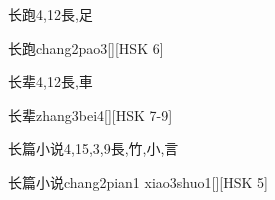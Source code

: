 \begin{Entry}{长跑}{4,12}{⾧,⾜}
  \begin{Phonetics}{长跑}{chang2pao3}[][HSK 6]
  \end{Phonetics}
\end{Entry}

\begin{Entry}{长辈}{4,12}{⾧,⾞}
  \begin{Phonetics}{长辈}{zhang3bei4}[][HSK 7-9]
  \end{Phonetics}
\end{Entry}

\begin{Entry}{长篇小说}{4,15,3,9}{⾧,⽵,⼩,⾔}
  \begin{Phonetics}{长篇小说}{chang2pian1 xiao3shuo1}[][HSK 5]
  \end{Phonetics}
\end{Entry}


